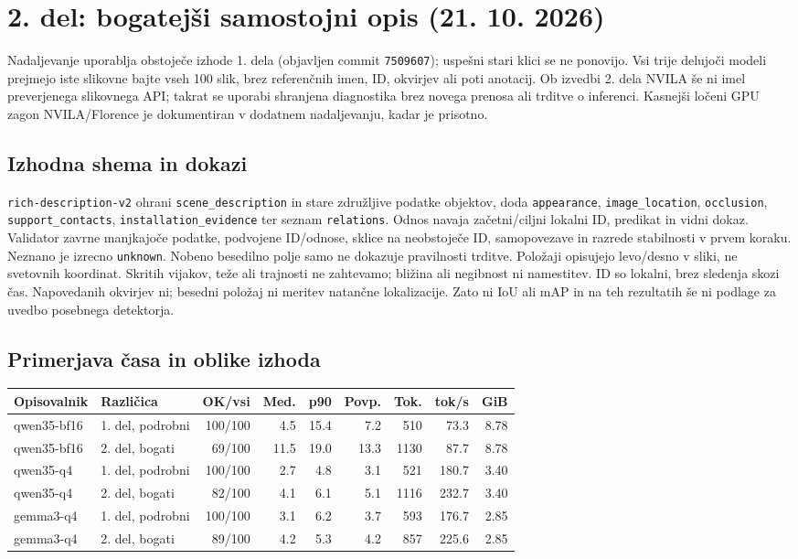 \section*{2. del: bogatejši samostojni opis (21. 10. 2026)}
Nadaljevanje uporablja obstoječe izhode 1. dela (objavljen commit \texttt{7509607}); uspešni stari klici se ne ponovijo. Vsi trije delujoči modeli prejmejo iste slikovne bajte vseh 100 slik, brez referenčnih imen, ID, okvirjev ali poti anotacij. Ob izvedbi 2. dela NVILA še ni imel preverjenega slikovnega API; takrat se uporabi shranjena diagnostika brez novega prenosa ali trditve o inferenci. Kasnejši ločeni GPU zagon NVILA/Florence je dokumentiran v dodatnem nadaljevanju, kadar je prisotno.
\subsection*{Izhodna shema in dokazi}
\texttt{rich-description-v2} ohrani \texttt{scene\_description} in stare združljive podatke objektov, doda \texttt{appearance}, \texttt{image\_location}, \texttt{occlusion}, \texttt{support\_contacts}, \texttt{installation\_evidence} ter seznam \texttt{relations}. Odnos navaja začetni/ciljni lokalni ID, predikat in vidni dokaz. Validator zavrne manjkajoče podatke, podvojene ID/odnose, sklice na neobstoječe ID, samopovezave in razrede stabilnosti v prvem koraku. Neznano je izrecno \texttt{unknown}. Nobeno besedilno polje samo ne dokazuje pravilnosti trditve.
Položaji opisujejo levo/desno v sliki, ne svetovnih koordinat. Skritih vijakov, teže ali trajnosti ne zahtevamo; bližina ali negibnost ni namestitev. ID so lokalni, brez sledenja skozi čas. Napovedanih okvirjev ni; besedni položaj ni meritev natančne lokalizacije. Zato ni IoU ali mAP in na teh rezultatih še ni podlage za uvedbo posebnega detektorja.
\subsection*{Primerjava časa in oblike izhoda}
\begin{center}\small\begin{tabular}{llrrrrrrr}\toprule
Opisovalnik & Različica & OK/vsi & Med. & p90 & Povp. & Tok. & tok/s & GiB \\ \midrule
qwen35-bf16 & 1. del, podrobni & 100/100 & 4.5 & 15.4 & 7.2 & 510 & 73.3 & 8.78 \\
qwen35-bf16 & 2. del, bogati & 69/100 & 11.5 & 19.0 & 13.3 & 1130 & 87.7 & 8.78 \\
qwen35-q4 & 1. del, podrobni & 100/100 & 2.7 & 4.8 & 3.1 & 521 & 180.7 & 3.40 \\
qwen35-q4 & 2. del, bogati & 82/100 & 4.1 & 6.1 & 5.1 & 1116 & 232.7 & 3.40 \\
gemma3-q4 & 1. del, podrobni & 100/100 & 3.1 & 6.2 & 3.7 & 593 & 176.7 & 2.85 \\
gemma3-q4 & 2. del, bogati & 89/100 & 4.2 & 5.3 & 4.2 & 857 & 225.6 & 2.85 \\
\bottomrule\end{tabular}\end{center}

